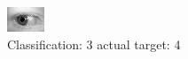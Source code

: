 \begin{figure}[h!]
\begin{center}
\includegraphics[width=0.60\columnwidth]{figures/ID703_class_3_target_4.png}
\end{center}
\caption{ Classification: 3 actual target: 4}
\label{fig:ID703_class_3_target_4}
\end{figure}
